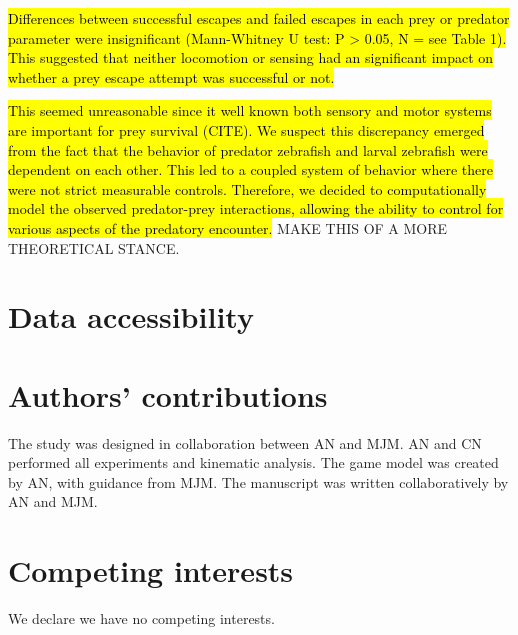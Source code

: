 \documentclass[]{rsos}%
\begin{document}
\hl{Differences between successful escapes and failed escapes in each prey or predator parameter were insignificant (Mann-Whitney U test: P > 0.05, N = see Table 1).
This suggested that neither locomotion or sensing had an significant impact on whether a prey escape attempt was successful or not.}

\hl{This seemed unreasonable since it well known both sensory and motor systems are important for prey survival (CITE). We suspect this discrepancy emerged from the fact that the behavior of predator zebrafish and larval zebrafish were dependent on each other. This led to a coupled system of behavior where there were not strict measurable controls. Therefore, we decided to computationally model the observed predator-prey interactions, allowing the ability to control for various aspects of the predatory encounter.}
MAKE THIS OF A MORE THEORETICAL STANCE.


\section*{Data accessibility}


\section*{Authors' contributions}
The study was designed in collaboration between AN and MJM.
AN and CN performed all experiments and kinematic analysis.
The game model was created by AN, with guidance from MJM. 
The manuscript was written collaboratively by AN and MJM.

\section*{Competing interests}
We declare we have no competing interests.
\end{document}
